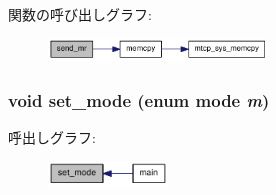 関数の呼び出しグラフ:\nopagebreak
\begin{figure}[H]
\begin{center}
\leavevmode
\includegraphics[width=165pt]{rdma-common_8c_aa7bbf375e749e0c78b50ff21ad9013f7_cgraph}
\end{center}
\end{figure}
\hypertarget{rdma-common_8c_abe5494f2e0e27dd073dafa13b2f89f5e}{
\subsubsection[{set\_\-mode}]{\setlength{\rightskip}{0pt plus 5cm}void set\_\-mode (enum {\bf mode} {\em m})}}
\label{rdma-common_8c_abe5494f2e0e27dd073dafa13b2f89f5e}


呼出しグラフ:\nopagebreak
\begin{figure}[H]
\begin{center}
\leavevmode
\includegraphics[width=90pt]{rdma-common_8c_abe5494f2e0e27dd073dafa13b2f89f5e_icgraph}
\end{center}
\end{figure}
